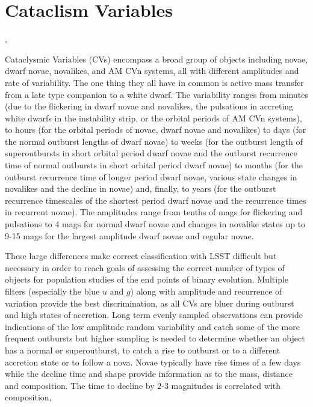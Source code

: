%
%
%
%
%
%
%
%

\section{Cataclism Variables}
\def\secname{CVtransients}\label{sec:\secname} %

,  %

Cataclysmic Variables (CVs) encompass a broad group of objects
including novae, dwarf novae, novalikes, and AM CVn systems, all with different
amplitudes and rate of variability. The one thing they all have in
common is active mass transfer from a late type companion to a
white dwarf. The variability ranges from minutes (due to the flickering in
dwarf novae and novalikes, the pulsations in accreting white dwarfs in
the instability strip, or the orbital periods of AM CVn systems), to
hours (for the orbital periods of novae, dwarf novae and novalikes) to
days (for the normal outburst lengths of dwarf novae) to 
weeks (for the outburst length of superoutbursts in short orbital period
dwarf novae and the outburst recurrence time of normal outbursts in short
orbital period dwarf novae) to months (for the outburst recurrence time of 
longer period dwarf novae, various state changes in novalikes and the decline 
in novae) and, finally, to years (for the outburst recurrence timescales of the 
shortest period dwarf novae and the recurrence times in recurrent novae). The 
amplitudes range from tenths of mags for flickering and pulsations to 4 mags 
for normal dwarf novae and changes in novalike states up to 9-15 mags for the 
largest amplitude dwarf novae and regular novae.

These large differences make correct classification with LSST difficult
but necessary in order to reach goals of assessing the correct number
of types of objects for population studies of the end points of
binary evolution. Multiple filters (especially the blue $u$ and $g$) 
along with amplitude and recurrence of variation provide the best
discrimination, as all CVs are bluer during outburst and high states of
accretion. Long term evenly sampled observations can provide indications
of the low amplitude random variability and catch some of the more frequent
outbursts but higher sampling is needed to determine whether an object
has a normal or superoutburst, to catch a rise to outburst or to a
different accretion state or to follow a nova. Novae typically
have rise times of a few days while the decline time and shape provide
information as to the mass, distance and composition. The time to decline
by 2-3 magnitudes is correlated with composition,

